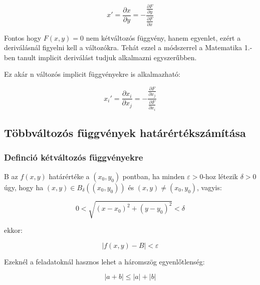 \documentclass{article}
\begin{document}
\begin{equation*}
    x' = \frac{\partial x}{\partial y} = -\frac{\frac{\partial F}{\partial y}}{\frac{\partial F}{\partial x}}
\end{equation*}

Fontos hogy $F(x,y) = 0$ nem kétváltozós függvény, hanem egyenlet, ezért a deriválásnál figyelni kell a változókra.
 Tehát ezzel a módszerrel a Matematika 1.-ben tanult implicit deriválást tudjuk alkalmazni egyszerűbben. 

\vspace{4mm}

Ez akár n változós implicit függvényekre is alkalmazható:

\begin{equation*}
    x_i' = \frac{\partial x_i}{\partial x_j} = -\frac{\frac{\partial F}{\partial x_j}}{\frac{\partial F}{\partial x_i}}
\end{equation*}

\newpage

\subsection{Többváltozós függvények határértékszámítása}

\subsubsection{Definció kétváltozós függvényekre}

B az $f(x,y)$ határértéke a $(x_0, y_0)$ pontban, ha minden $\varepsilon  > 0$-hoz létezik $\delta > 0$ úgy, hogy ha $(x,y) \in B_{\delta}((x_0, y_0))$ és $(x,y) \neq (x_0, y_0)$, vagyis:

\begin{equation*}
    0 < \sqrt{(x-x_0)^2 + (y-y_0)^2} < \delta
\end{equation*}

ekkor:

\begin{equation*}
    \left\lvert f(x,y) - B \right\rvert < \varepsilon
\end{equation*}

\vspace{4mm}

Ezeknél a feladatoknál hasznos lehet a háromszög egyenlőtlenség:

\begin{equation*}
    \left\lvert a + b \right\rvert \leq \left\lvert a \right\rvert + \left\lvert b \right\rvert
\end{equation*}
\end{document}
